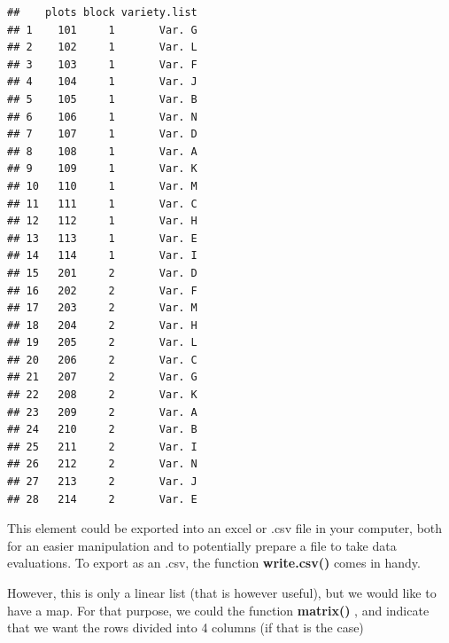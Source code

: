 \documentclass[
]{book}
\newenvironment{Shaded}{\begin{snugshade}}{\end{snugshade}}
\newcommand{\AttributeTok}[1]{\textcolor[rgb]{0.77,0.63,0.00}{#1}}
\newcommand{\CommentTok}[1]{\textcolor[rgb]{0.56,0.35,0.01}{\textit{#1}}}
\newcommand{\DecValTok}[1]{\textcolor[rgb]{0.00,0.00,0.81}{#1}}
\newcommand{\FunctionTok}[1]{\textcolor[rgb]{0.00,0.00,0.00}{#1}}
\newcommand{\NormalTok}[1]{#1}
\newcommand{\OtherTok}[1]{\textcolor[rgb]{0.56,0.35,0.01}{#1}}
\newcommand{\SpecialCharTok}[1]{\textcolor[rgb]{0.00,0.00,0.00}{#1}}
\newcommand{\StringTok}[1]{\textcolor[rgb]{0.31,0.60,0.02}{#1}}
\begin{document}
\begin{Shaded}
\end{Shaded}

\begin{verbatim}
##    plots block variety.list
## 1    101     1       Var. G
## 2    102     1       Var. L
## 3    103     1       Var. F
## 4    104     1       Var. J
## 5    105     1       Var. B
## 6    106     1       Var. N
## 7    107     1       Var. D
## 8    108     1       Var. A
## 9    109     1       Var. K
## 10   110     1       Var. M
## 11   111     1       Var. C
## 12   112     1       Var. H
## 13   113     1       Var. E
## 14   114     1       Var. I
## 15   201     2       Var. D
## 16   202     2       Var. F
## 17   203     2       Var. M
## 18   204     2       Var. H
## 19   205     2       Var. L
## 20   206     2       Var. C
## 21   207     2       Var. G
## 22   208     2       Var. K
## 23   209     2       Var. A
## 24   210     2       Var. B
## 25   211     2       Var. I
## 26   212     2       Var. N
## 27   213     2       Var. J
## 28   214     2       Var. E
\end{verbatim}

This element could be exported into an excel or .csv file in your computer, both for an easier manipulation and to potentially prepare a file to take data evaluations. To export as an .csv, the function \textbf{write.csv() } comes in handy.

\begin{Shaded}
\end{Shaded}

However, this is only a linear list (that is however useful), but we would like to have a map. For that purpose, we could the function \textbf{matrix() }, and indicate that we want the rows divided into 4 columns (if that is the case)

\begin{Shaded}
\end{Shaded}
\end{document}
